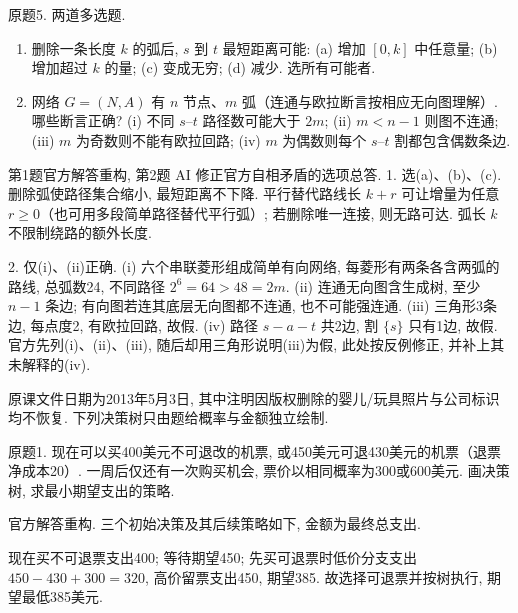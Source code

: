 \begin{exercise}\label{ass:15053-rec9-q5}
原题5. 两道多选题.
\begin{enumerate}[label=\arabic*.]
\item 删除一条长度 $k$ 的弧后, $s$ 到 $t$ 最短距离可能: (a) 增加 $[0,k]$ 中任意量; (b) 增加超过 $k$ 的量; (c) 变成无穷; (d) 减少. 选所有可能者.
\item 网络 $G=(N,A)$ 有 $n$ 节点、$m$ 弧（连通与欧拉断言按相应无向图理解）. 哪些断言正确? (i) 不同 $s$--$t$ 路径数可能大于 $2m$; (ii) $m<n-1$ 则图不连通; (iii) $m$ 为奇数则不能有欧拉回路; (iv) $m$ 为偶数则每个 $s$--$t$ 割都包含偶数条边.
\end{enumerate}
\end{exercise}
\begin{solution}
第1题官方解答重构, 第2题 AI 修正官方自相矛盾的选项总答. 1. 选(a)、(b)、(c). 删除弧使路径集合缩小, 最短距离不下降. 平行替代路线长 $k+r$ 可让增量为任意 $r\ge0$（也可用多段简单路径替代平行弧）; 若删除唯一连接, 则无路可达. 弧长 $k$ 不限制绕路的额外长度.

2. 仅(i)、(ii)正确. (i) 六个串联菱形组成简单有向网络, 每菱形有两条各含两弧的路线, 总弧数24, 不同路径 $2^6=64>48=2m$. (ii) 连通无向图含生成树, 至少 $n-1$ 条边; 有向图若连其底层无向图都不连通, 也不可能强连通. (iii) 三角形3条边, 每点度2, 有欧拉回路, 故假. (iv) 路径 $s-a-t$ 共2边, 割 $\{s\}$ 只有1边, 故假. 官方先列(i)、(ii)、(iii), 随后却用三角形说明(iii)为假, 此处按反例修正, 并补上其未解释的(iv).
\end{solution}

原课文件日期为2013年5月3日, 其中注明因版权删除的婴儿/玩具照片与公司标识均不恢复. 下列决策树只由题给概率与金额独立绘制.
\begin{exercise}\label{ass:15053-rec10-q1}
原题1. 现在可以买400美元不可退改的机票, 或450美元可退430美元的机票（退票净成本20）. 一周后仅还有一次购买机会, 票价以相同概率为300或600美元. 画决策树, 求最小期望支出的策略.
\end{exercise}
\begin{solution}
官方解答重构. 三个初始决策及其后续策略如下, 金额为最终总支出.
\begin{center}\end{center}
现在买不可退票支出400; 等待期望450; 先买可退票时低价分支支出 $450-430+300=320$, 高价留票支出450, 期望385. 故选择可退票并按树执行, 期望最低385美元.
\end{solution}

